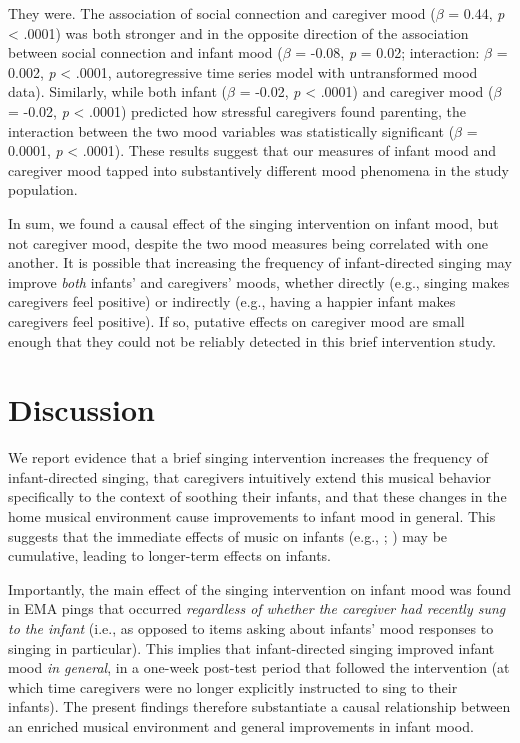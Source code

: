 \documentclass[
]{article}
\begin{document}
They were. The association of social connection and caregiver mood
(\(\beta\) = 0.44, \emph{p} \textless{} .0001) was both stronger and in
the opposite direction of the association between social connection and
infant mood (\(\beta\) = -0.08, \emph{p} = 0.02; interaction: \(\beta\)
= 0.002, \emph{p} \textless{} .0001, autoregressive time series model
with untransformed mood data). Similarly, while both infant (\(\beta\) =
-0.02, \emph{p} \textless{} .0001) and caregiver mood (\(\beta\) =
-0.02, \emph{p} \textless{} .0001) predicted how stressful caregivers
found parenting, the interaction between the two mood variables was
statistically significant (\(\beta\) = 0.0001, \emph{p} \textless{}
.0001). These results suggest that our measures of infant mood and
caregiver mood tapped into substantively different mood phenomena in the
study population.

In sum, we found a causal effect of the singing intervention on infant
mood, but not caregiver mood, despite the two mood measures being
correlated with one another. It is possible that increasing the
frequency of infant-directed singing may improve \emph{both} infants'
and caregivers' moods, whether directly (e.g., singing makes caregivers
feel positive) or indirectly (e.g., having a happier infant makes
caregivers feel positive). If so, putative effects on caregiver mood are
small enough that they could not be reliably detected in this brief
intervention study.

\section{Discussion}\label{discussion}

We report evidence that a brief singing intervention increases the
frequency of infant-directed singing, that caregivers intuitively extend
this musical behavior specifically to the context of soothing their
infants, and that these changes in the home musical environment cause
improvements to infant mood in general. This suggests that the immediate
effects of music on infants (e.g.,
;
) may be cumulative,
leading to longer-term effects on infants.

Importantly, the main effect of the singing intervention on infant mood
was found in EMA pings that occurred \emph{regardless of whether the
caregiver had recently sung to the infant} (i.e., as opposed to items
asking about infants' mood responses to singing in particular). This
implies that infant-directed singing improved infant mood \emph{in
general}, in a one-week post-test period that followed the intervention
(at which time caregivers were no longer explicitly instructed to sing
to their infants). The present findings therefore substantiate a causal
relationship between an enriched musical environment and general
improvements in infant mood.
\end{document}

